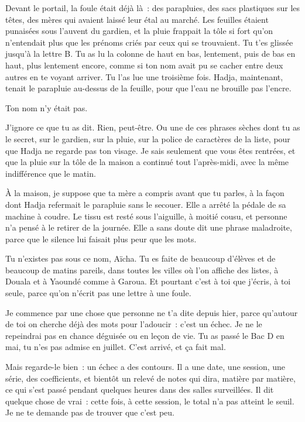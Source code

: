 \documentclass[10.5pt,twoside,openright]{book}
\begin{document}
Devant le portail, la foule était déjà là : des parapluies, des sacs plastiques sur les têtes, des mères qui avaient laissé leur étal au marché. Les feuilles étaient punaisées sous l’auvent du gardien, et la pluie frappait la tôle si fort qu’on n’entendait plus que les prénoms criés par ceux qui se trouvaient. Tu t’es glissée jusqu’à la lettre B. Tu as lu la colonne de haut en bas, lentement, puis de bas en haut, plus lentement encore, comme si ton nom avait pu se cacher entre deux autres en te voyant arriver. Tu l’as lue une troisième fois. Hadja, maintenant, tenait le parapluie au-dessus de la feuille, pour que l’eau ne brouille pas l’encre.

Ton nom n’y était pas.

J’ignore ce que tu as dit. Rien, peut-être. Ou une de ces phrases sèches dont tu as le secret, sur le gardien, sur la pluie, sur la police de caractères de la liste, pour que Hadja ne regarde pas ton visage. Je sais seulement que vous êtes rentrées, et que la pluie sur la tôle de la maison a continué tout l’après-midi, avec la même indifférence que le matin.

À la maison, je suppose que ta mère a compris avant que tu parles, à la façon dont Hadja refermait le parapluie sans le secouer. Elle a arrêté la pédale de sa machine à coudre. Le tissu est resté sous l’aiguille, à moitié cousu, et personne n’a pensé à le retirer de la journée. Elle a sans doute dit une phrase maladroite, parce que le silence lui faisait plus peur que les mots.

Tu n’existes pas sous ce nom, Aïcha. Tu es faite de beaucoup d’élèves et de beaucoup de matins pareils, dans toutes les villes où l’on affiche des listes, à Douala et à Yaoundé comme à Garoua. Et pourtant c’est à toi que j’écris, à toi seule, parce qu’on n’écrit pas une lettre à une foule.

Je commence par une chose que personne ne t’a dite depuis hier, parce qu’autour de toi on cherche déjà des mots pour l’adoucir : c’est un échec. Je ne le repeindrai pas en chance déguisée ou en leçon de vie. Tu as passé le Bac D en mai, tu n’es pas admise en juillet. C’est arrivé, et ça fait mal.

Mais regarde-le bien : un échec a des contours. Il a une date, une session, une série, des coefficients, et bientôt un relevé de notes qui dira, matière par matière, ce qui s’est passé pendant quelques heures dans des salles surveillées. Il dit quelque chose de vrai : cette fois, à cette session, le total n’a pas atteint le seuil. Je ne te demande pas de trouver que c’est peu.
\end{document}

